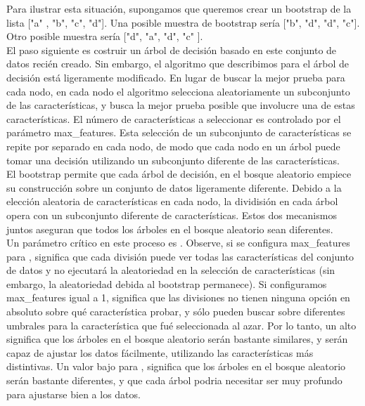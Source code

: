 {Para ilustrar esta situación, supongamos que queremos crear un bootstrap de la lista ["{}a"{} , "{}b"{}, "{}c"{}, "{}d"{}].
 Una posible muestra de bootstrap sería ["{}b"{}, "{}d"{}, "{}d"{}, "{}c"{}]. Otro posible muestra sería ["{}d"{}, "{}a"{}, "{}d"{}, "{}c"{} ].\\



El paso siguiente es costruir un árbol de decisión basado en este conjunto de datos recién creado. Sin embargo, el algoritmo que describimos para el árbol de decisión está ligeramente modificado. En lugar de buscar la mejor prueba para cada nodo, en cada nodo el algoritmo selecciona aleatoriamente un subconjunto de las características, y busca la mejor prueba posible que involucre una de estas características. El número de características a seleccionar es controlado por el parámetro {\ttfamily max\_features}. Esta selección de un subconjunto de características se repite por separado en cada nodo, de modo que cada  nodo en un árbol puede tomar una decisión utilizando un subconjunto diferente de las características.\\


El bootstrap  permite que  cada árbol de decisión, en el bosque aleatorio empiece su construcción 
sobre un conjunto de datos ligeramente diferente.  Debido a la elección aleatoria de características en cada nodo, la dividisión  en cada árbol opera con un subconjunto diferente de características. Estos dos mecanismos juntos aseguran que todos los árboles en el bosque aleatorio sean diferentes.\\



Un parámetro crítico en este proceso es {}. Observe, si se configura {\ttfamily max\_features}  para   {},  significa que cada división puede ver todas las características del conjunto de datos y no ejecutará la aleatoriedad en la selección de características (sin embargo, la aleatoriedad debida al bootstrap permanece).  Si configuramos {\ttfamily max\_features} igual a  1, significa que las divisiones no tienen ninguna opción en absoluto sobre qué característica probar, y sólo pueden buscar sobre diferentes umbrales para la característica que fué seleccionada  al azar. Por lo tanto, un alto {} significa que los árboles en el bosque aleatorio serán bastante similares, y serán capaz de ajustar los datos fácilmente, utilizando las características más distintivas. Un valor bajo para  {},  significa que los árboles en el bosque aleatorio serán bastante diferentes, y que cada árbol podria necesitar ser muy profundo para ajustarse bien a los datos.\\
 
}

